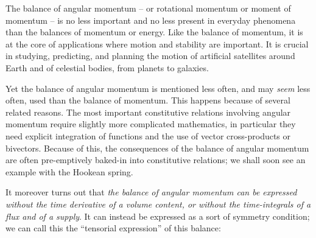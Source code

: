 \documentclass[a4paper,12pt,%
onecolumn,oneside,%
british%
]{memoir}
\renewcommand*{\|}[1][]{\nonscript\:#1\vert\nonscript\:\mathopen{}}
\begin{document}
The balance of angular momentum -- or rotational momentum or moment of momentum -- is no less important and no less present in everyday phenomena than the balances of momentum or energy. Like the balance of momentum, it is at the core of applications where motion and stability are important. It is crucial in studying, predicting, and planning the motion of artificial satellites around Earth and of celestial bodies, from planets to galaxies.

Yet the balance of angular momentum is mentioned less often, and may \emph{seem} less often, used than the balance of momentum. This happens because of several related reasons. The most important constitutive relations involving angular momentum require slightly more complicated mathematics, in particular they need explicit integration of functions and the use of vector cross-products or bivectors. Because of this, the consequences of the balance of angular momentum are often pre-emptively baked-in into constitutive relations; we shall soon see an example with the Hookean spring.



It moreover turns out that \emph{the balance of angular momentum can be expressed without the time derivative of a volume content, or without the time-integrals of a flux and of a supply}. It can instead be expressed as a sort of symmetry condition; we can call this the \enquote{tensorial expression} of this balance:
\end{document}
